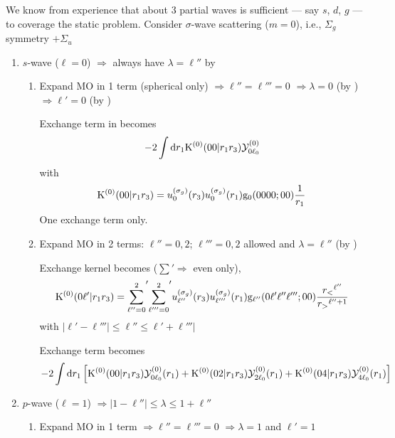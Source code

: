 \documentclass[aps,pra,groupedaddress,12pt,
               amsfonts,amssymb,
               preprint
    ]{revtex4}
\begin{document}
We know from experience that about 3 partial waves is sufficient --- say
$s$, $d$, $g$ --- to coverage the static problem. Consider $\sigma$-wave
scattering ($m = 0$), i.e., $\Sigma_g$ symmetry $+ \Sigma_u$
\begin{enumerate}
\item $s$-wave ($\ell = 0$) $\Rightarrow$ always have $\lambda = \ell''$
  by   \qquad [$\Sigma_g$]
  \begin{enumerate}
  \item Expand MO in 1 term (spherical only) $\Rightarrow \ell'' =
    \ell''' = 0$ $\Rightarrow \lambda = 0$ (by ) $\Rightarrow
    \ell' = 0$ (by )

    Exchange term in  becomes
    \begin{equation*}
      -2\int\mathrm{d} r_1\mathrm{K}^{(0)}(00|r_1r_3)\mathcal{Y}_{0\ell_0}^{(0)}
    \end{equation*}
    with
    \begin{equation*}
      \mathrm{K}^{(0)}(00|r_1r_3) =
      u_0^{(\sigma_g)}(r_3)u_0^{(\sigma_g)}(r_1)\mathrm{g}_0(0000;00)\dfrac{1}{r_1} 
    \end{equation*}
    One exchange term only.
  \item Expand MO in 2 terms: $\ell'' = 0, 2$; $\ell''' = 0, 2$ allowed
    and $\lambda = \ell''$ (by )

    Exchange kernel becomes ($\sum' \Rightarrow$ even only),
    \begin{equation*}
      \mathrm{K}^{(0)}(0\ell'|r_1r_3) ={\sum_{\ell''=0}^2}'{\sum_{\ell'''=0}^2}'
      u_{\ell''}^{(\sigma_g)}(r_3)u_{\ell'''}^{(\sigma_g)}(r_1)
      \mathrm{g}_{\ell''}(0\ell'\ell''\ell''';00)\dfrac{r_<{}^{\ell''}}{r_>{}^{\ell''+1}}
    \end{equation*}
    with $|\ell'-\ell'''| \leq \ell'' \leq \ell'+\ell'''|$

    Exchange term becomes
    \begin{equation*}
      -2\int\mathrm{d} r_1\left[\mathrm{K}^{(0)}(00|r_1r_3)\mathcal{Y}_{0\ell_0}^{(0)}(r_1)
                        +\mathrm{K}^{(0)}(02|r_1r_3)\mathcal{Y}_{2\ell_0}^{(0)}(r_1)
                        +\mathrm{K}^{(0)}(04|r_1r_3)\mathcal{Y}_{4\ell_0}^{(0)}(r_1)\right]
    \end{equation*}
  \end{enumerate}
\item $p$-wave ($\ell = 1$) $\Rightarrow |1-\ell''| \leq \lambda \leq
  1+\ell''$ \qquad [$\Sigma_u$]
  \begin{enumerate}
  \item Expand MO in 1 term $\Rightarrow \ell''=\ell'''=0$ $\Rightarrow
    \lambda =1$ and $\ell'=1$


\end{enumerate}
\end{enumerate}
\end{document}
